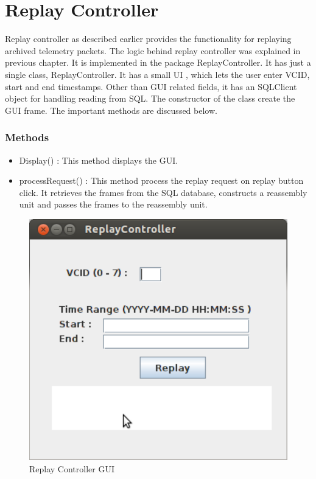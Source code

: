\documentclass[BTech]{iitmdiss}
\begin{document}
\section{Replay Controller}
Replay controller as described earlier provides the functionality for replaying archived telemetry packets. The logic behind replay controller was explained in previous chapter. It is implemented in the package ReplayController. It has just a single class, ReplayController. It has a small UI , which lets the user enter VCID, start and end timestamps. Other than GUI related fields, it has an SQLClient object for handling reading from SQL. 
The constructor of the class create the GUI frame. The important methods are discussed below.
\subsubsection{Methods}
\begin{itemize}
\item Display() : This method displays the GUI.
\item processRequest() : This method process the replay request on replay button click. It retrieves the frames from the SQL database, constructs a reassembly unit and passes the  frames to the reassembly unit. 
\end{itemize}

\begin{figure}[H]
\centering
\includegraphics[scale = 0.8]{replay.pdf}
\centering 
\caption{Replay Controller GUI}
\label{fig:replay}
\end{figure}
\end{document}
